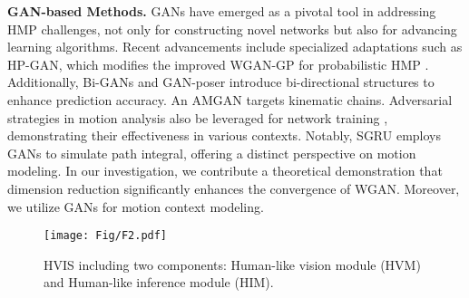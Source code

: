 \textbf{GAN-based Methods.} \quad
GANs have emerged as a pivotal tool in addressing HMP challenges, not only for constructing novel networks but also for advancing learning algorithms. Recent advancements include specialized adaptations such as HP-GAN, which modifies the improved WGAN-GP for probabilistic HMP \cite{HPgan}. Additionally, Bi-GANs \cite{Bigan} and GAN-poser \cite{Gan-poser} introduce bi-directional structures to enhance prediction accuracy. An AMGAN \cite{AMGAN} targets kinematic chains.
Adversarial strategies in motion analysis also be leveraged for network training \cite{ARNET, AGED, yao2024swift}, demonstrating their effectiveness in various contexts. Notably, SGRU \cite{SGRU} employs GANs to simulate path integral, offering a distinct perspective on motion modeling.
In our investigation, we contribute a theoretical demonstration that dimension reduction significantly enhances the convergence of WGAN. Moreover, we utilize GANs for motion context modeling.

\begin{figure*}[t]
\begin{center}
\texttt{[image: Fig/F2.pdf]}
\caption{HVIS including two components: Human-like vision module (HVM) and Human-like inference module (HIM).}
\label{fig:2}
\end{center}
\end{figure*}